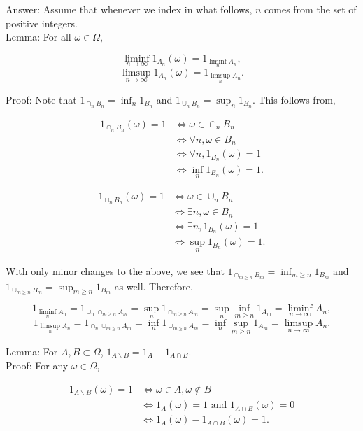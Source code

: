 \documentclass{article}
\begin{document}
Answer: Assume that whenever we index in what follows, $n$ comes from the set of positive integers.\\

Lemma: For all $\omega \in \Omega$,

$$
\liminf_{n\rightarrow \infty} 1_{A_n}(\omega) = 1_{\liminf_n A_n},
$$
$$
\limsup_{n\rightarrow \infty} 1_{A_n}(\omega) = 1_{\limsup_n A_n}.
$$

Proof: Note that $1_{\cap_{n} B_n} = \inf_n 1_{B_n}$ and $1_{\cup_n B_n} = \sup_n 1_{B_n}$. This follows from,

\begin{align*}
1_{\cap_n B_n}(\omega) = 1 &\iff \omega \in \cap_n B_n \\
&\iff \forall n, \omega \in B_n \\
&\iff \forall n, 1_{B_n}(\omega) = 1 \\
&\iff \inf_n 1_{B_n}(\omega) = 1.
\end{align*}

\begin{align*}
1_{\cup_n B_n}(\omega) = 1 &\iff \omega \in \cup_n B_n \\
&\iff \exists n, \omega \in B_n \\
&\iff \exists n, 1_{B_n}(\omega) = 1 \\
&\iff \sup_n 1_{B_n}(\omega) = 1.
\end{align*}

With only minor changes to the above, we see that $1_{\cap_{m\geq n} B_m} = \inf_{m\geq n} 1_{B_m}$ and $1_{\cup_{m\geq n} B_m} = \sup_{m\geq n} 1_{B_m}$ as well. Therefore,

$$
1_{\liminf_n A_n} = 1_{\cup_n \cap_{m\geq n} A_m} = \sup_n 1_{\cap_{m\geq n} A_m} = \sup_n \inf_{m\geq n} 1_{A_m} = \liminf_{n\rightarrow \infty} A_n,
$$
$$
1_{\limsup_n A_n} = 1_{\cap_n \cup_{m\geq n} A_m} = \inf_n 1_{\cup_{m\geq n} A_m} = \inf_n \sup_{m\geq n} 1_{A_m} = \limsup_{n\rightarrow \infty} A_n.
$$

Lemma: For $A,B \subset \Omega$, $1_{A \backslash B} = 1_A - 1_{A\cap B}$. \\

Proof: For any $\omega \in \Omega$,

\begin{align*}
1_{A\backslash B}(\omega) = 1 &\iff \omega \in A, \omega \not\in B \\
& \iff 1_A(\omega) = 1 \text{ and } 1_{A \cap B}(\omega) = 0 \\
& \iff 1_A(\omega) - 1_{A\cap B}(\omega) = 1.
\end{align*}
\end{document}
